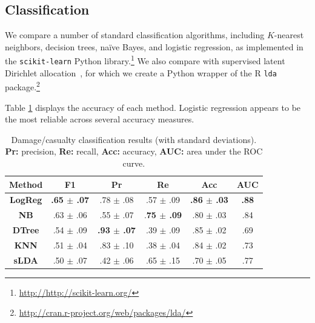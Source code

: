 \documentclass{article}
\begin{document}
\subsection{Classification}
We compare a number of standard classification algorithms, including
$K$-nearest neighbors, decision trees, na\"ive Bayes, and logistic regression,
as implemented in the {\tt scikit-learn} Python
library.\footnote{\url{http://http://scikit-learn.org/}} We also compare with
supervised latent Dirichlet allocation~\cite{blei10supervised}, for which we
create a Python wrapper of the R {\tt lda}
package.\footnote{\url{http://cran.r-project.org/web/packages/lda/}}

Table \ref{tab.classification_results} displays the accuracy of each
method. Logistic regression appears to be the most reliable across several
accuracy measures.


\begin{table}[t]
\centering
\begin{tabular}{|c|c|c|c|c|c|}
\hline
{\bf Method}  &  {\bf F1}        &  {\bf Pr}       &  {\bf Re}       & {\bf Acc}       &  {\bf AUC}\\
\hline
{\bf LogReg}  & {\bf .65 $\pm$ .07}& .78 $\pm$ .08       &  .57 $\pm$ .09       & {\bf .86 $\pm$ .03}& {\bf .88} \\
{\bf NB}      & .63 $\pm$ .06      & .55 $\pm$ .07       &  .{\bf 75 $\pm$ .09} & .80 $\pm$ .03      & .84 \\
{\bf DTree}   & .54 $\pm$ .09      & {\bf .93 $\pm$ .07} &  .39 $\pm$ .09       & .85 $\pm$ .02      & .69 \\
{\bf KNN}     & .51 $\pm$ .04      & .83 $\pm$ .10       &  .38 $\pm$ .04       & .84 $\pm$ .02      & .73 \\
{\bf sLDA}    & .50 $\pm$ .07      & .42 $\pm$ .06       &  .65 $\pm$ .15       & .70 $\pm$ .05      & .77 \\
\hline
\end{tabular}
\caption{Damage/casualty classification results (with standard
  deviations). {\bf Pr:} precision, {\bf Re:} recall, {\bf Acc:} accuracy,
  {\bf AUC:} area under the ROC curve. \label{tab.classification_results}}
\end{table}
\end{document}
